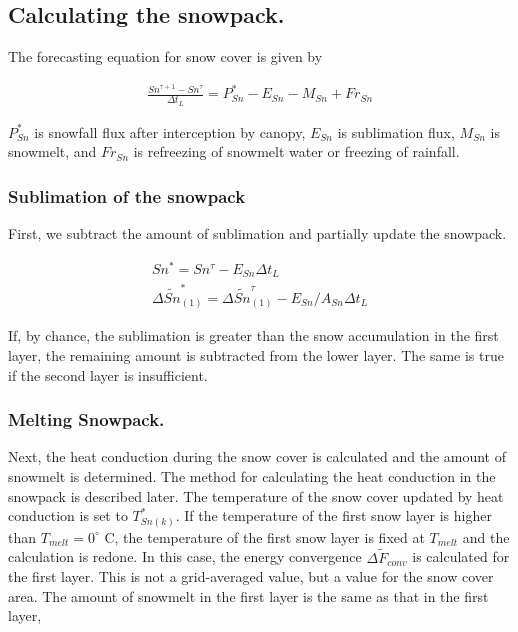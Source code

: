 \hypertarget{calculating-the-snowpack.}{%
\subsection{Calculating the snowpack.}\label{calculating-the-snowpack.}}

The forecasting equation for snow cover is given by

\begin{eqnarray}
 \frac{Sn^{\tau+1}-Sn^{\tau}}{\Delta t_L} = P_{Sn}^* - E_{Sn} - M_{Sn} + Fr_{Sn}
\end{eqnarray}

\(P_{Sn}^*\) is snowfall flux after interception by canopy, \(E_{Sn}\)
is sublimation flux, \(M_{Sn}\) is snowmelt, and \(Fr_{Sn}\) is
refreezing of snowmelt water or freezing of rainfall.

\hypertarget{sublimation-of-the-snowpack}{%
\subsubsection{Sublimation of the
snowpack}\label{sublimation-of-the-snowpack}}

First, we subtract the amount of sublimation and partially update the
snowpack.

\begin{eqnarray}
 Sn^* = Sn^{\tau} - E_{Sn} \Delta t_L \\
 \Delta \widetilde{Sn}_{(1)}^* = \Delta \widetilde{Sn}_{(1)}^{\tau} - E_{Sn}/A_{Sn} \Delta t_L
\end{eqnarray}

If, by chance, the sublimation is greater than the snow accumulation in
the first layer, the remaining amount is subtracted from the lower
layer. The same is true if the second layer is insufficient.

\hypertarget{melting-snowpack.}{%
\subsubsection{Melting Snowpack.}\label{melting-snowpack.}}

Next, the heat conduction during the snow cover is calculated and the
amount of snowmelt is determined. The method for calculating the heat
conduction in the snowpack is described later. The temperature of the
snow cover updated by heat conduction is set to \(T_{Sn(k)}^*\). If the
temperature of the first snow layer is higher than
\(T_{melt} = 0^{\circ}\) C, the temperature of the first snow layer is
fixed at \(T_{melt}\) and the calculation is redone. In this case, the
energy convergence \(\Delta \widetilde{F}_{conv}\) is calculated for the
first layer. This is not a grid-averaged value, but a value for the snow
cover area. The amount of snowmelt in the first layer is the same as
that in the first layer,

